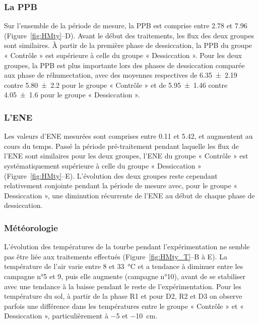 \subsubsection{La PPB}

Sur l'ensemble de la période de mesure, la PPB est comprise entre \num{2.78} et \SI{7.96}{\uml} (Figure~\ref{fig:HMty}--D).
Avant le début des traitements, les flux des deux groupes sont similaires.
À partir de la première phase de dessiccation, la PPB du groupe « Contrôle » est supérieure à celle du groupe « Dessiccation ».
Pour les deux groupes, la PPB est plus importante lors des phases de dessiccation comparée aux phase de réhumectation, avec des moyennes respectives de \num{6.35(219)} contre \num{5.80(220)} pour le groupe « Contrôle » et de \num{5.95(146)} contre \SI{4.05(160)}{\uml} pour le groupe « Dessiccation ».

\subsubsection{L'ENE}

Les valeurs d'ENE mesurées sont comprises entre \num{0.11} et \SI{5.42}{\uml}, et augmentent au cours du temps.
Passé la période pré-traitement pendant laquelle les flux de l'ENE sont similaires pour les deux groupes, l'ENE du groupe « Contrôle » est systématiquement supérieure à celle du groupe « Dessiccation » (Figure~\ref{fig:HMty}--E).
L'évolution des deux groupes reste cependant relativement conjointe pendant la période de mesure avec, pour le groupe « Dessiccation », une diminution récurrente de l'ENE au début de chaque phase de dessiccation.

\subsubsection{Météorologie}

L'évolution des températures de la tourbe pendant l'expérimentation ne semble pas être liée aux traitements effectués (Figure~\ref{fig:HMty_T}--B à E).
La température de l'air varie entre 8 et \SI{33}{\degreeCelsius} et a tendance à diminuer entre les campagne n°5 et 9, puis elle augmente (campagne n°10), avant de se stabiliser avec une tendance à la baisse pendant le reste de l'expérimentation.
Pour les température du sol, à partir de la phase R1 et pour D2, R2 et D3 on observe parfois une différence dans les températures entre le groupe « Contrôle » et « Dessiccation », particulièrement à \num{-5} et \SI{-10}{\centi\metre}.


